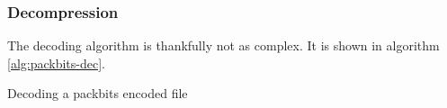 \subsubsection{Decompression}

  The decoding algorithm is thankfully not as complex. It is shown in
  algorithm \ref{alg:packbits-dec}.

\begin{algorithm}
  \caption{Decoding a \rle packbits encoded file}\algohack{}
  \label{alg:packbits-dec}
  \begin{algorithmic}[1]


    \While{\neof}



        \State {}
        \EndRepeatn
      \Else

        \State {}
        \EndRepeatn

      \EndIf


    \EndWhile
  \end{algorithmic}
\end{algorithm}

\FloatBarrier

\answers{}

